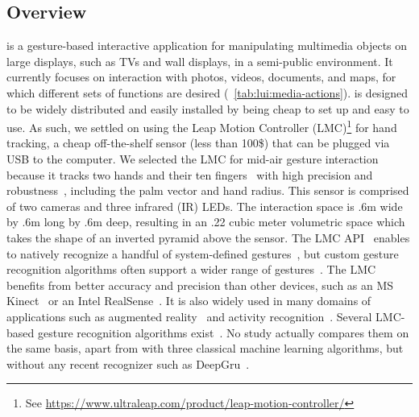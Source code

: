 \subsection{Overview} \label{sec:lui:description:overview}
\lui is a gesture-based interactive application for manipulating multimedia objects on large displays, such as TVs and wall displays, in a semi-public environment.
It currently focuses on interaction with photos, videos, documents, and maps, for which different sets of functions are desired (\tab~\ref{tab:lui:media-actions}). \lui is designed to be widely distributed and easily installed by being cheap to set up and easy to use. As such, we settled on using the Leap Motion Controller (LMC)\footnote{See \url{https://www.ultraleap.com/product/leap-motion-controller/}} for hand tracking, a cheap off-the-shelf sensor (less than 100\$) that can be plugged via USB to the computer. We selected the LMC for mid-air gesture interaction because it tracks two hands and their ten fingers~\cite{Colgan:2017} with high precision and robustness~\cite{Weichert:2013}, including the palm vector and hand radius. This sensor is comprised of two cameras and three infrared (IR) LEDs. The interaction space is .6m wide by .6m long by .6m deep, resulting in an .22 cubic meter volumetric space which takes the shape of an inverted pyramid above the sensor.
The LMC API~\cite{Spiegelmock:2013} enables to natively recognize a handful of system-defined gestures~\cite{Brandon:2014}, but custom gesture recognition algorithms often support a wider range of gestures~\cite{Bachmann:2018}. The LMC benefits from better accuracy and precision than other devices, such as an MS Kinect~\cite{Guzsvinecz:2019} or an Intel RealSense~\cite{Khalaf:2019}.
It is also widely used in many domains of applications such as augmented reality~\cite{Lopez:2015} and activity recognition~\cite{Marin:2016}. Several LMC-based gesture recognition algorithms exist~\cite{Bachmann:2018}. No study actually compares them on the same basis, apart from \cite{Filho:2018} with three classical machine learning algorithms, but without any recent recognizer such as  DeepGru~\cite{Maghoumi:2019}.

